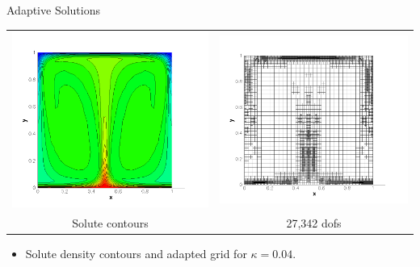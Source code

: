 \documentclass[compress,12pt]{beamer}
\begin{document}
\begin{frame}{Adaptive Solutions}
  {
  \begin{center}
      \begin{tabular}{cc} \\
	\includegraphics[width=.5\textwidth]{figures/s_adapt_kappa_0_04}&
	\includegraphics[width=.5\textwidth]{figures/grid_adapt_kappa_0_04}\\
	Solute contours &
	27,342 dofs
      \end{tabular}\end{center}
      \begin{itemize}
 	
      \item Solute density contours and adapted grid for $\kappa=0.04$.
      \end{itemize}
  }


\end{frame}
\end{document}
